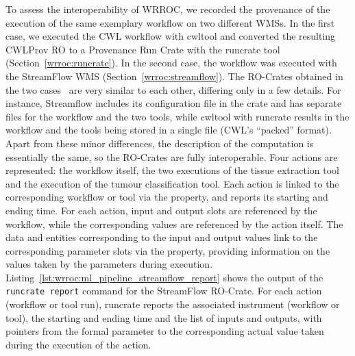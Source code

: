 To assess the interoperability of WRROC, we recorded the provenance of the execution of the same exemplary workflow on two different WMSs.
In the first case, we executed the CWL workflow with cwltool and converted the resulting CWLProv RO to a Provenance Run Crate with the runcrate tool (Section~\ref{wrroc:runcrate}).
In the second case, the workflow was executed with the StreamFlow WMS (Section~\ref{wrroc:streamflow}).
%
The RO-Crates obtained in the two cases~\cite{run-pathology, Colonnelli 2023}
are very similar to each other, differing only in a few details. For instance, Streamflow includes its configuration file in the crate and has separate files for the workflow and the two tools, while
cwltool with runcrate results in the workflow and the tools being stored in a single file (CWL's ``packed'' format).
Apart from these minor differences, the description of the computation is essentially the same, so the RO-Crates are fully interoperable.
%
Four actions are represented: the workflow itself, the two executions of the tissue extraction tool and the execution of the tumour classification tool.
Each action is linked to the corresponding workflow or tool via the
 property, and reports its starting and ending time. For each action, input and output slots are referenced by the workflow, while the corresponding values are referenced by the action itself.
The data and  entities corresponding to the input and output values link to the corresponding parameter slots via the  property, providing information on the values taken by the parameters during execution.
Listing~\ref{lst:wrroc:ml_pipeline_streamflow_report} shows the output of the
\texttt{runcrate report} command for the StreamFlow RO-Crate. 
For each action (workflow or tool run), runcrate reports the associated instrument (workflow or tool), the starting and ending time and the list of inputs and outputs, with pointers from the formal parameter to the corresponding actual value taken during the execution of the action.

